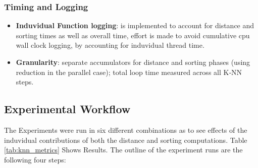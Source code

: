 \subsubsection{Timing and Logging}
\begin{itemize}
\item \textbf{Induvidual Function logging}: is implemented to account for distance and sorting times as well as overall time, effort is made to avoid cumulative cpu wall clock logging, by accounting for induvidual thread time.
\item \textbf{Granularity}: separate accumulators for distance and sorting phases (using reduction in the parallel case); total loop time measured across all K‑NN steps.
\end{itemize}

\subsection{Experimental Workflow}
The Experiments were run in six different combinations as to see effects of the induvidual contributions of both the distance and sorting computations. Table \ref{tab:knn_metrics} Shows Results. The outline of the experiment runs are the following four steps:

